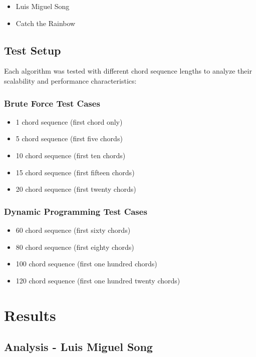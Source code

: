\documentclass[conference]{IEEEtran}
\begin{document}
\begin{itemize}
    \item Luis Miguel Song
    \item Catch the Rainbow
\end{itemize}

\subsection{Test Setup}
Each algorithm was tested with different chord sequence lengths to analyze their scalability and performance characteristics:

\subsubsection{Brute Force Test Cases}
\begin{itemize}
    \item 1 chord sequence (first chord only)
    \item 5 chord sequence (first five chords)
    \item 10 chord sequence (first ten chords)
    \item 15 chord sequence (first fifteen chords)
    \item 20 chord sequence (first twenty chords)
\end{itemize}

\subsubsection{Dynamic Programming Test Cases}
\begin{itemize}
    \item 60 chord sequence (first sixty chords)
    \item 80 chord sequence (first eighty chords)
    \item 100 chord sequence (first one hundred chords)
    \item 120 chord sequence (first one hundred twenty chords)
\end{itemize}

\section{Results}
\subsection{Analysis - Luis Miguel Song}
\end{document}
